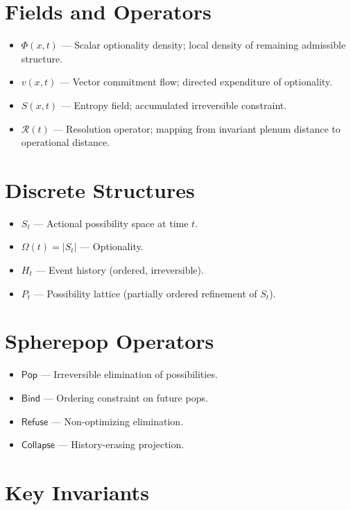\documentclass[11pt]{book}
\begin{document}
\section{Fields and Operators}

\begin{itemize}
\item $\Phi(x,t)$ — Scalar optionality density; local density of remaining
admissible structure.
\item $v(x,t)$ — Vector commitment flow; directed expenditure of optionality.
\item $S(x,t)$ — Entropy field; accumulated irreversible constraint.
\item $\mathcal{R}(t)$ — Resolution operator; mapping from invariant plenum
distance to operational distance.
\end{itemize}

\section{Discrete Structures}

\begin{itemize}
\item $S_t$ — Actional possibility space at time $t$.
\item $\Omega(t) = |S_t|$ — Optionality.
\item $H_t$ — Event history (ordered, irreversible).
\item $P_t$ — Possibility lattice (partially ordered refinement of $S_t$).
\end{itemize}

\section{Spherepop Operators}

\begin{itemize}
\item $\textsf{Pop}$ — Irreversible elimination of possibilities.
\item $\textsf{Bind}$ — Ordering constraint on future pops.
\item $\textsf{Refuse}$ — Non-optimizing elimination.
\item $\textsf{Collapse}$ — History-erasing projection.
\end{itemize}

\section{Key Invariants}
\end{document}
